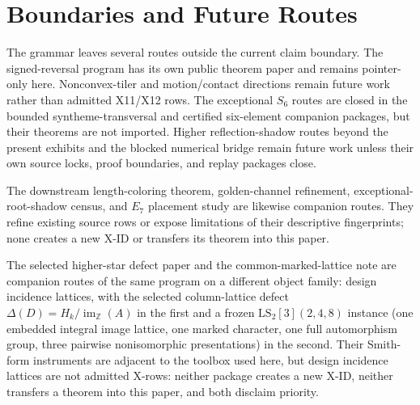 \section{Boundaries and Future Routes}

The grammar leaves several routes outside the current claim boundary.  The signed-reversal program has its own public theorem paper and remains pointer-only here.  Nonconvex-tiler and motion/contact directions remain future work rather than admitted X11/X12 rows.  The exceptional \(S_6\) routes are closed in the bounded syntheme-transversal and certified six-element companion packages, but their theorems are not imported.  Higher reflection-shadow routes beyond the present exhibits and the blocked numerical bridge remain future work unless their own source locks, proof boundaries, and replay packages close.

The downstream length-coloring theorem, golden-channel refinement, exceptional-root-shadow census, and \(E_7\) placement study are likewise companion routes\cite{BabanskyyTypeBLengthColored2026,BabanskyyGoldenChannel2026,BabanskyyExceptionalFingerprints2026,BabanskyyGassmannE7Placements2026}.  They refine existing source rows or expose limitations of their descriptive fingerprints; none creates a new X-ID or transfers its theorem into this paper.

The selected higher-star defect paper and the common-marked-lattice note\cite{BabanskyyHigherStarDefect2026,BabanskyyCommonMarkedLattice2026} are companion routes of the same program on a different object family: design incidence lattices, with the selected column-lattice defect \(\Delta(D)=H_k/\operatorname{im}_{\mathbb Z}(A)\) in the first and a frozen \(\mathrm{LS}_2[3](2,4,8)\) instance (one embedded integral image lattice, one marked character, one full automorphism group, three pairwise nonisomorphic presentations) in the second.  Their Smith-form instruments are adjacent to the toolbox used here, but design incidence lattices are not admitted X-rows: neither package creates a new X-ID, neither transfers a theorem into this paper, and both disclaim priority.

